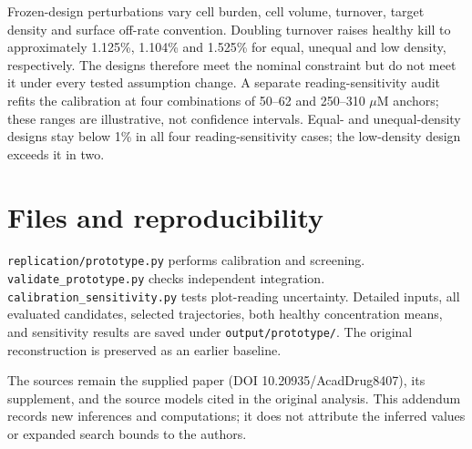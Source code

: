 \documentclass[11pt,a4paper]{article}
\begin{document}
Frozen-design perturbations vary cell burden, cell volume, turnover, target density and surface off-rate convention. Doubling turnover raises healthy kill to approximately 1.125\%, 1.104\% and 1.525\% for equal, unequal and low density, respectively. The designs therefore meet the nominal constraint but do not meet it under every tested assumption change. A separate reading-sensitivity audit refits the calibration at four combinations of 50--62 and 250--310 $\mu$M anchors; these ranges are illustrative, not confidence intervals. Equal- and unequal-density designs stay below 1\% in all four reading-sensitivity cases; the low-density design exceeds it in two.

\section{Files and reproducibility}
\texttt{replication/prototype.py} performs calibration and screening. \texttt{validate\_prototype.py} checks independent integration. \texttt{calibration\_sensitivity.py} tests plot-reading uncertainty. Detailed inputs, all evaluated candidates, selected trajectories, both healthy concentration means, and sensitivity results are saved under \texttt{output/prototype/}. The original reconstruction is preserved as an earlier baseline.

The sources remain the supplied paper (DOI 10.20935/AcadDrug8407), its supplement, and the source models cited in the original analysis. This addendum records new inferences and computations; it does not attribute the inferred values or expanded search bounds to the authors.
\end{document}
